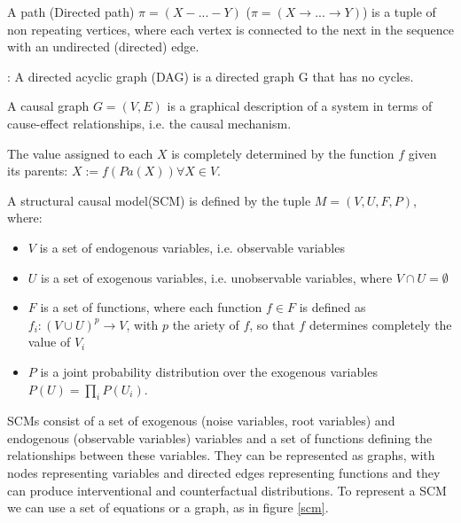 \begin{definition}
    A path (Directed path) $\pi = (X - ... - Y)$ ($\pi = (X \rightarrow ... \rightarrow Y)$) is a tuple of non repeating vertices, where each vertex is connected to the next in the sequence with an undirected (directed) edge.
\end{definition}
\begin{definition} : 
    A directed acyclic graph (DAG) is a directed graph G that has no cycles.
\end{definition}
\begin{definition}
    A causal graph $G = (V, E)$ is a graphical description of a system in terms of cause-effect relationships, i.e. the causal mechanism.
\end{definition}
\begin{definition}
    The value assigned to each $X$ is completely determined by the function $f$ given its parents: $X := f (Pa(X)) ∀X ∈ V$.
\end{definition}
\begin{definition}
    A structural causal model(SCM) is defined by the tuple $M = (V, U, F, P)$, where:
    \begin{itemize}
        \item $V$ is a set of endogenous variables, i.e. observable variables
        \item $U$ is a set of exogenous variables, i.e. unobservable variables, where $V \cap U = \emptyset$
        \item $F$ is a set of functions, where each function $f \in F$ is defined as $f_i : (V \cup U)^p \rightarrow V$, with $p$ the ariety of $f$, so that $f$ determines completely the value of $V_i$
        \item $P$ is a joint probability distribution over the exogenous variables $P(U) = \prod_i P(U_i)$.
    \end{itemize}
\end{definition}

SCMs consist of a set of exogenous (noise variables, root variables) and endogenous (observable variables) variables and a set of functions defining the relationships between these variables. They can be represented as graphs, with nodes representing variables and directed edges representing functions and they can produce interventional and counterfactual distributions. To represent a SCM we can use a set of equations or a graph, as in figure \ref{scm}.\\

